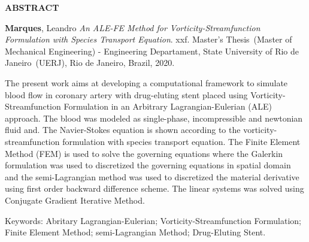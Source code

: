\begin{center}
\textbf{ABSTRACT}
\end{center}


$\!$\\

\hspace{-1.3cm}\textbf{Marques}, Leandro \textit{An ALE-FE Method for Vorticity-Streamfunction Formulation with Species Transport Equation}. xxf. Master's Thesis~(Master of Mechanical Engineering) - Engineering Departament, State University of Rio de Janeiro~(UERJ), Rio de Janeiro, Brazil, 2020.

\vspace{.2cm}

\indent 
The present work aims at developing a 
computational framework to simulate blood flow 
in coronary artery with
drug-eluting stent placed using Vorticity-Streamfunction 
Formulation in an Arbitrary Lagrangian-Eulerian (ALE) approach.
The blood was modeled as single-phase, incompressible 
and newtonian fluid and. The Navier-Stokes equation is 
shown according to the vorticity-streamfunction 
formulation with species transport equation.
The Finite Element Method (FEM) is used to solve 
the governing equations where the Galerkin formulation was used
to discretized the governing equations in spatial domain 
and the semi-Lagrangian method was used to discretized 
the material derivative using first order backward difference scheme. 
The linear systems was solved using Conjugate Gradient Iterative Method.

\vspace{1cm}

\hspace{-1.3cm}Keywords: Abritary Lagrangian-Eulerian; Vorticity-Streamfunction Formulation; Finite Element Method; semi-Lagrangian Method; Drug-Eluting Stent.
